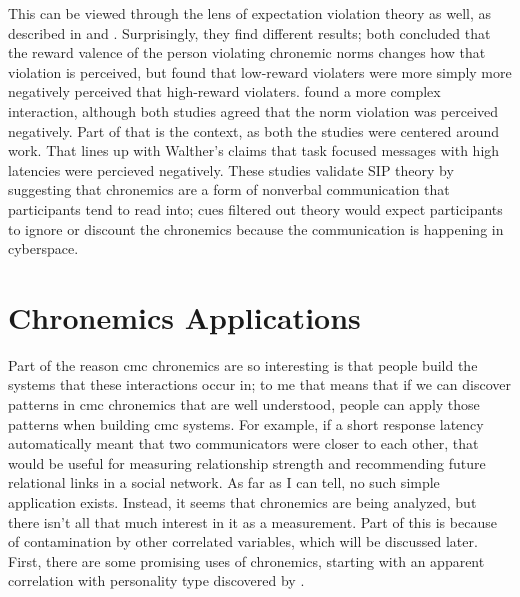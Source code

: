 \documentclass[
  stu]{apa7}
\begin{document}
This can be viewed through the lens of expectation violation theory as
well, as described in \textcite{kalman11} and \textcite{sheldon06}.
Surprisingly, they find different results; both concluded that the
reward valence of the person violating chronemic norms changes how that
violation is perceived, but \textcite{sheldon06} found that low-reward
violaters were more simply more negatively perceived that high-reward
violaters. \textcite{kalman11} found a more complex interaction,
although both studies agreed that the norm violation was perceived
negatively. Part of that is the context, as both the studies were
centered around work. That lines up with Walther's claims that task
focused messages with high latencies were percieved negatively. These
studies validate SIP theory by suggesting that chronemics are a form of
nonverbal communication that participants tend to read into; cues
filtered out theory would expect participants to ignore or discount the
chronemics because the communication is happening in cyberspace.

\hypertarget{chronemics-applications}{%
\section{Chronemics Applications}\label{chronemics-applications}}

Part of the reason cmc chronemics are so interesting is that people
build the systems that these interactions occur in; to me that means
that if we can discover patterns in cmc chronemics that are well
understood, people can apply those patterns when building cmc systems.
For example, if a short response latency automatically meant that two
communicators were closer to each other, that would be useful for
measuring relationship strength and recommending future relational links
in a social network. As far as I can tell, no such simple application
exists. Instead, it seems that chronemics are being analyzed, but there
isn't all that much interest in it as a measurement. Part of this is
because of contamination by other correlated variables, which will be
discussed later. First, there are some promising uses of chronemics,
starting with an apparent correlation with personality type discovered
by \textcite{kalman13}.
\end{document}
